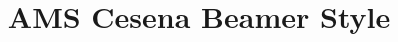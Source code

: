 \newcommand{\swatch}[1]{\fcolorbox{owgreyline}{#1}{\rule{0pt}{1.3ex}\rule{2.2ex}{0pt}}}
\newcommand{\swgroup}[1]{\multicolumn{2}{@{}l}{\textcolor{owbluedeep}{\textbf{#1}}}}
\title[AMS Cesena Beamer Style]
{AMS Cesena Beamer Style}
